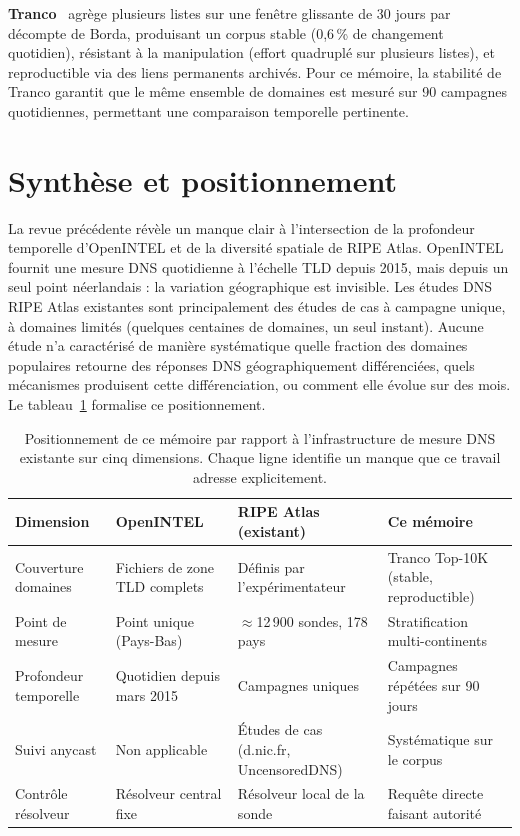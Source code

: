 \textbf{Tranco}~\cite{LePochat2019} agrège plusieurs listes sur une fenêtre glissante de 30 jours par décompte de Borda, produisant un corpus stable (0,6\,\% de changement quotidien), résistant à la manipulation (effort quadruplé sur plusieurs listes), et reproductible via des liens permanents archivés. Pour ce mémoire, la stabilité de Tranco garantit que le même ensemble de domaines est mesuré sur 90 campagnes quotidiennes, permettant une comparaison temporelle pertinente.

\section{Synthèse et positionnement}
\label{sec:2.7}

La revue précédente révèle un manque clair à l'intersection de la profondeur temporelle d'OpenINTEL et de la diversité spatiale de RIPE Atlas. OpenINTEL fournit une mesure DNS quotidienne à l'échelle TLD depuis 2015, mais depuis un seul point néerlandais : la variation géographique est invisible. Les études DNS RIPE Atlas existantes sont principalement des études de cas à campagne unique, à domaines limités (quelques centaines de domaines, un seul instant). Aucune étude n'a caractérisé de manière systématique quelle fraction des domaines populaires retourne des réponses DNS géographiquement différenciées, quels mécanismes produisent cette différenciation, ou comment elle évolue sur des mois. Le tableau~\ref{tab:gap_analysis} formalise ce positionnement.

\begin{table}[tp]
\centering
\small
\begin{tabularx}{\linewidth}{p{2.8cm} p{3.5cm} p{3.8cm} X}
\toprule
\textbf{Dimension} & \textbf{OpenINTEL} & \textbf{RIPE Atlas (existant)} & \textbf{Ce mémoire} \\
\midrule
Couverture domaines  & Fichiers de zone TLD complets & Définis par l'expérimentateur & Tranco Top-10K (stable, reproductible) \\
Point de mesure      & Point unique (Pays-Bas) & $\approx$12\,900 sondes, 178 pays & Stratification multi-continents \\
Profondeur temporelle & Quotidien depuis mars 2015 & Campagnes uniques & Campagnes répétées sur 90 jours \\
Suivi anycast        & Non applicable & Études de cas (d.nic.fr, UncensoredDNS) & Systématique sur le corpus \\
Contrôle résolveur   & Résolveur central fixe & Résolveur local de la sonde & Requête directe faisant autorité \\
\bottomrule
\end{tabularx}
\caption{Positionnement de ce mémoire par rapport à l'infrastructure de mesure DNS existante sur cinq dimensions. Chaque ligne identifie un manque que ce travail adresse explicitement.}
\label{tab:gap_analysis}
\end{table}

